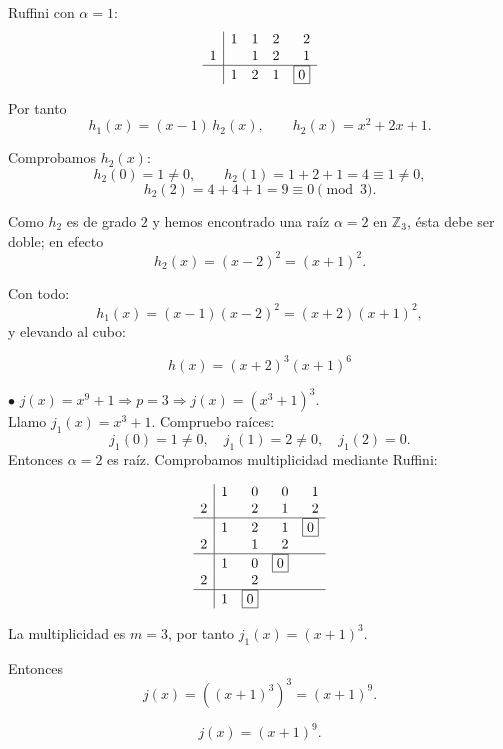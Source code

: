 \documentclass[a4paper,12pt]{article}
\begin{document}
\begin{ejercicio}[title=Ejercicio 51]

Ruffini con \(\alpha=1\):
\[
\begin{array}{r|rrrr}
  & 1 & 1 & 2 & 2 \\
1 &   & 1 & 2 & 1 \\
\hline
  & 1 & 2 & 1 & \boxed{0}
\end{array}
\]

Por tanto
\[
h_1(x)=(x-1)\,h_2(x),\qquad h_2(x)=x^2+2x+1.
\]

Comprobamos \(h_2(x)\):
\[
h_2(0)=1\neq0,\qquad h_2(1)=1+2+1=4\equiv1\neq0,
\]
\[
h_2(2)=4+4+1=9\equiv0\pmod{3}.
\]

Como \(h_2\) es de grado \(2\) y hemos encontrado una raíz \(\alpha=2\) en \(\mathbb{Z}_3\), ésta debe ser doble; en efecto
\[
h_2(x)=(x-2)^2=(x+1)^2.
\]

Con todo:
\[
h_1(x)=(x-1)(x-2)^2=(x+2)(x+1)^2,
\]
y elevando al cubo:

\[
\boxed{h(x)=(x+2)^3 (x+1)^6}
\]

\medskip

\noindent\(\bullet\) \(j(x) = x^9 + 1 \Rightarrow p = 3 \Rightarrow j(x) = (x^3 + 1)^3.\) \\

Llamo \(j_1(x) = x^3 + 1.\) Compruebo raíces:
\[
j_1(0) = 1 \neq 0,\quad j_1(1) = 2 \neq 0,\quad j_1(2) = 0.
\]
Entonces \(\alpha = 2\) es raíz. Comprobamos multiplicidad mediante Ruffini:

\[
\begin{array}{r|rrrr}
  & 1 & 0 & 0 & 1 \\
2 &   & 2 & 1 & 2 \\
\hline
  & 1 & 2 & 1 & \boxed{0} \\
2 &   & 1 & 2 \\
\hline
  & 1 & 0 & \boxed{0} \\
2 &   & 2 \\
\hline
  & 1 & \boxed{0}
\end{array}
\]

La multiplicidad es \(m = 3\), por tanto \(j_1(x) = (x + 1)^3.\)

Entonces
\[
j(x) = ((x + 1)^3)^3 = (x + 1)^9.
\]

\[
\boxed{j(x) = (x + 1)^9.}
\]

\end{ejercicio}
\end{document}
